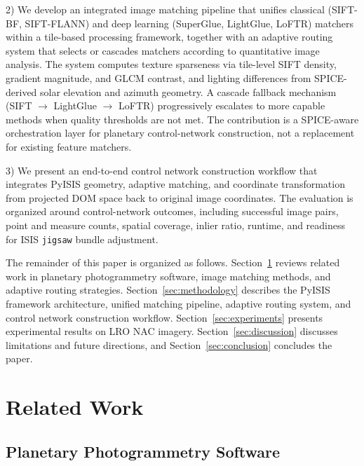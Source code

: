 \documentclass[lettersize,journal]{IEEEtran}
\newcommand{\pyisis}{PyISIS}
\begin{document}
2) We develop an integrated image matching pipeline that unifies classical (SIFT-BF, SIFT-FLANN) and deep learning (SuperGlue, LightGlue, LoFTR) matchers within a tile-based processing framework, together with an adaptive routing system that selects or cascades matchers according to quantitative image analysis. The system computes texture sparseness via tile-level SIFT density, gradient magnitude, and GLCM contrast, and lighting differences from SPICE-derived solar elevation and azimuth geometry. A cascade fallback mechanism (SIFT $\rightarrow$ LightGlue $\rightarrow$ LoFTR) progressively escalates to more capable methods when quality thresholds are not met. The contribution is a SPICE-aware orchestration layer for planetary control-network construction, not a replacement for existing feature matchers.

3) We present an end-to-end control network construction workflow that integrates \pyisis{} geometry, adaptive matching, and coordinate transformation from projected DOM space back to original image coordinates. The evaluation is organized around control-network outcomes, including successful image pairs, point and measure counts, spatial coverage, inlier ratio, runtime, and readiness for ISIS \texttt{jigsaw} bundle adjustment.

The remainder of this paper is organized as follows. Section~\ref{sec:related} reviews related work in planetary photogrammetry software, image matching methods, and adaptive routing strategies. Section~\ref{sec:methodology} describes the \pyisis{} framework architecture, unified matching pipeline, adaptive routing system, and control network construction workflow. Section~\ref{sec:experiments} presents experimental results on LRO NAC imagery. Section~\ref{sec:discussion} discusses limitations and future directions, and Section~\ref{sec:conclusion} concludes the paper.


\section{Related Work}\label{sec:related}

\subsection{Planetary Photogrammetry Software}
\end{document}
